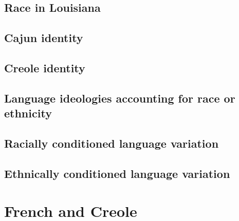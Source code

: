     \subsection{Race in Louisiana}
    \subsection{Cajun identity}
    \subsection{Creole identity}
    \subsection{Language ideologies accounting for race or ethnicity}
    \subsection{Racially conditioned language variation}
    \subsection{Ethnically conditioned language variation}
  \section{French and Creole}
